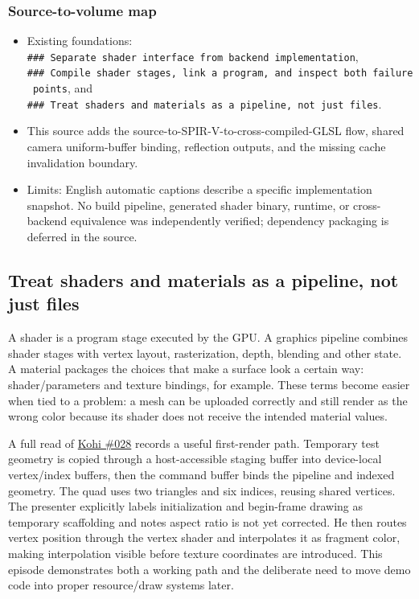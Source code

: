 \subsubsection{Source-to-volume map}\label{06-engine-ii-ch026-source-to-volume-map}

\begin{itemize}
\tightlist
\item
  Existing foundations: \texttt{\#\#\#\ Separate\ shader\ interface\ from\ backend\ implementation}, \texttt{\#\#\#\ Compile\ shader\ stages,\ link\ a\ program,\ and\ inspect\ both\ failure\ points}, and \texttt{\#\#\#\ Treat\ shaders\ and\ materials\ as\ a\ pipeline,\ not\ just\ files}.
\item
  This source adds the source-to-SPIR-V-to-cross-compiled-GLSL flow, shared camera uniform-buffer binding, reflection outputs, and the missing cache invalidation boundary.
\item
  Limits: English automatic captions describe a specific implementation snapshot. No build pipeline, generated shader binary, runtime, or cross-backend equivalence was independently verified; dependency packaging is deferred in the source.
\end{itemize}

\subsection{Treat shaders and materials as a pipeline, not just files}\label{06-engine-ii-ch026-treat-shaders-and-materials-as-a-pipeline-not-just-files}

A shader is a program stage executed by the GPU. A graphics pipeline combines shader stages with vertex layout, rasterization, depth, blending and other state. A material packages the choices that make a surface look a certain way: shader/parameters and texture bindings, for example. These terms become easier when tied to a problem: a mesh can be uploaded correctly and still render as the wrong color because its shader does not receive the intended material values.

A full read of \href{https://www.youtube.com/watch?v=kgnc_hHVz_M}{Kohi \#028} records a useful first-render path. Temporary test geometry is copied through a host-accessible staging buffer into device-local vertex/index buffers, then the command buffer binds the pipeline and indexed geometry. The quad uses two triangles and six indices, reusing shared vertices. The presenter explicitly labels initialization and begin-frame drawing as temporary scaffolding and notes aspect ratio is not yet corrected. He then routes vertex position through the vertex shader and interpolates it as fragment color, making interpolation visible before texture coordinates are introduced. This episode demonstrates both a working path and the deliberate need to move demo code into proper resource/draw systems later.

